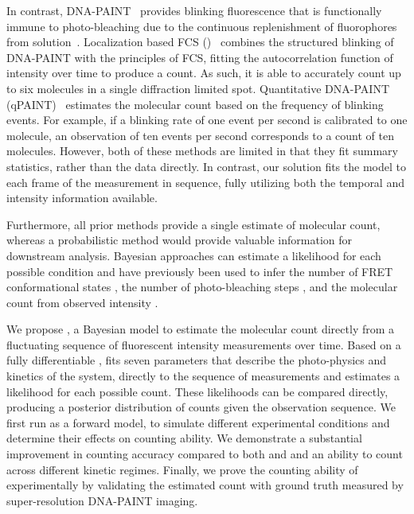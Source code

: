 %
In contrast, DNA-PAINT~\citep{schnitzbauer_2017} provides
blinking fluorescence that is functionally immune to photo-bleaching due to the
continuous replenishment of fluorophores from solution~\citep{stehr_2021}.
  Localization based FCS (\lbfcs)~\citep{stein_2019,stein_2021} combines the
  structured blinking of DNA-PAINT with the principles of FCS, fitting the
  autocorrelation function of intensity over time to produce a count. As such,
  it is able to accurately count up to six molecules in a single diffraction
  limited spot.
  Quantitative DNA-PAINT (qPAINT)~\citep{jungmann_2016} estimates the molecular
  count based on the frequency of blinking events. For example, if a blinking rate of one
  event per second is calibrated to one molecule, an observation of
  ten events per second corresponds to a count of ten molecules.
  However, both of these methods are limited in that they fit summary
  statistics, rather than the data directly.
  In contrast, our solution fits the model to each frame of the measurement 
  in sequence, fully utilizing both the temporal and intensity information available.
  
Furthermore, all prior methods provide a single estimate of molecular count, whereas 
a probabilistic method would provide valuable information for downstream analysis.
  Bayesian approaches can estimate a likelihood for each possible condition 
  and have previously been used to infer the number of FRET conformational 
  states \citep{hon_bayesian-estimated_2019, bronson_learning_2009}, 
  the number of photo-bleaching steps \citep{garry_bayesian_2020}, 
  and the molecular count from observed intensity \citep{nino_2017}.

We propose \ours, a Bayesian model to estimate the molecular count
directly from a fluctuating sequence of fluorescent intensity measurements over
time.
  Based on a fully differentiable \hmm, \ours fits
  seven parameters that describe the photo-physics and kinetics of the system, 
  directly to the sequence of measurements and
  estimates a likelihood for each possible count.
  These likelihoods can be compared directly, producing a posterior
  distribution of counts given the observation sequence.
  We first run \ours as a forward model, to simulate
  different experimental conditions and determine their effects on counting ability.
  We demonstrate a substantial improvement in counting accuracy compared to both \lbfcs and \qpaint
  and an ability to count across different kinetic regimes.
  Finally, we prove the counting ability of \ours experimentally by validating 
  the estimated count with ground truth measured by super-resolution DNA-PAINT imaging.


